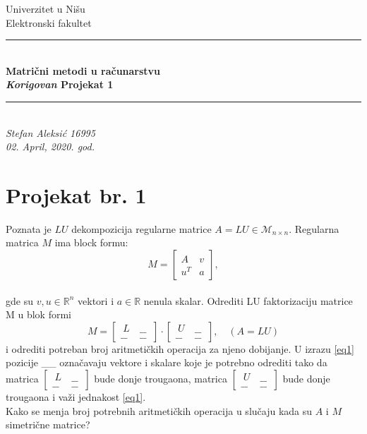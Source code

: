 \documentclass[11pt]{article}
\newcommand{\doublerule}[1][.4pt]{%
  \noindent
  \makebox[0pt][l]{\rule[.7ex]{\linewidth}{#1}}%
  \rule[.3ex]{\linewidth}{#1}}
\begin{document}
\begin{titlepage}
\begin {center}
\huge {Univerzitet u Nišu\\Elektronski fakultet
\vspace{7.5cm}
\\
\doublerule
\\
\vspace{1cm}
\textbf {\Huge{{Matrični metodi u računarstvu \\ \textit{Korigovan} Projekat 1}}}
\vspace{1cm}
\\
\doublerule
\\
\vspace{7.5cm}
\textit{{Stefan Aleksić 16995}\\\Large{02. April, 2020. god.}}}
\end{center}
\end{titlepage}
\newpage
\section*{Projekat br. 1}
Poznata je $LU$ dekompozicija regularne matrice $A=LU \in \mathcal {M}_{n\times n}$. Regularna matrica $M$ ima block formu:\\
\begin{equation*}
M=
\begin{bmatrix}
A & v \\ u^T & a
\end{bmatrix},
\end{equation*}
\\gde su $v, u\in \mathbb{R}^n $ vektori i $ a \in \mathbb{R} $ nenula skalar. Odrediti LU faktorizaciju matrice M u blok formi\\
\begin{equation*}\tag{1}\label{eq1}
M=
\begin{bmatrix}
\ L\  & \_\_\ \\ \_\_ & \_\_\ 
\end{bmatrix}
\cdot
\begin{bmatrix}
\ U\  & \_\_\ \\ \_\_ & \_\_\ 
\end{bmatrix},\quad (A=LU)
\end{equation*}
i odrediti potreban broj aritmetičkih operacija za njeno dobijanje. U izrazu \eqref{eq1} pozicije \_\_ označavaju vektore i skalare koje je potrebno odrediti tako da matrica
$ 
\begin{bmatrix}
\ L\  & \_\_\ \\ \_\_ & \_\_\ 
\end{bmatrix}
$
bude donje trougaona, matrica
$
\begin{bmatrix}
\ U\  & \_\_\ \\ \_\_ & \_\_\ 
\end{bmatrix}
$
bude donje trougaona i važi jednakost \eqref{eq1}.\\
Kako se menja broj potrebnih aritmetičkih operacija u slučaju kada su $A$ i $M$ simetrične matrice?
\end{document}
